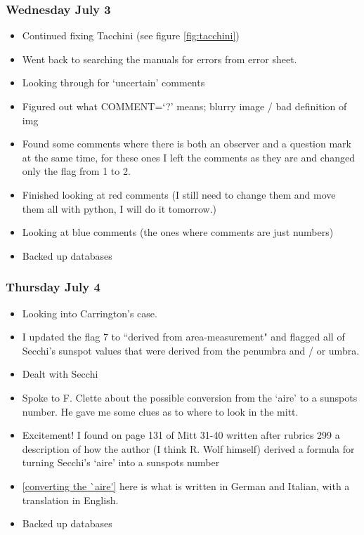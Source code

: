 \documentclass[12pt]{article}
\begin{document}
\subsubsection{Wednesday July 3}\label{what is flag 2 question mark}
\begin{itemize}
    \item Continued fixing Tacchini (see figure \ref{fig:tacchini})
    \item Went back to searching the manuals for errors from error sheet. 
    \item Looking through for `uncertain' comments
    \item Figured out what COMMENT=`?' means; blurry image / bad definition of img
    \item Found some comments where there is both an observer and a question mark at the same time, for these ones I left the comments as they are and changed only the flag from 1 to 2.
    \item Finished looking at red comments (I still need to change them and move them all with python, I will do it tomorrow.) 
    \item Looking at blue comments (the ones where comments are just numbers)
    \item Backed up databases
    \end{itemize}
            
\subsubsection{Thursday July 4}
\begin{itemize}
    \item Looking into Carrington's case.
    \item I updated the flag 7 to ``derived from area-measurement" and flagged all of Secchi's sunspot values that were derived from the penumbra and / or umbra.
    \item Dealt with Secchi
    \item Spoke to F. Clette about the possible conversion from the `aire' to a sunspots number. He gave me some clues as to where to look in the mitt.
    \item Excitement! I found on page 131 of Mitt 31-40 written after rubrics 299 a description of how the author (I think R. Wolf himself) derived a formula for turning Secchi's `aire' into a sunspots number
    \item \ref{converting the `aire'} here is what is written in German and Italian, with a translation in English.
    \item Backed up databases
\end{itemize}
        
\end{document}
